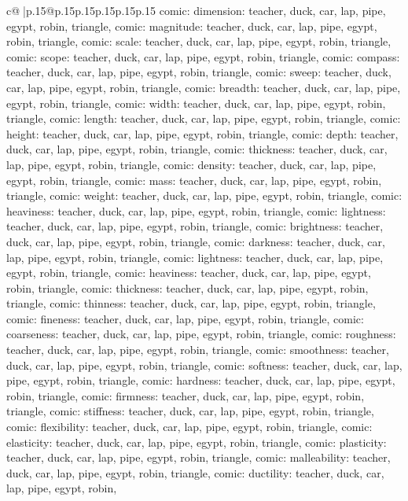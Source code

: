 \documentclass{article}
\begin{document}
{\begin{supertabular}{c@{$\;$}|p{.15\linewidth}@{}p{.15\linewidth}p{.15\linewidth}p{.15\linewidth}p{.15\linewidth}p{.15\linewidth}}
{{{comic\n\nCLUE: dimension\nTARGETS: teacher, duck, car, lap, pipe, egypt, robin, triangle, comic\n\nCLUE: magnitude\nTARGETS: teacher, duck, car, lap, pipe, egypt, robin, triangle, comic\n\nCLUE: scale\nTARGETS: teacher, duck, car, lap, pipe, egypt, robin, triangle, comic\n\nCLUE: scope\nTARGETS: teacher, duck, car, lap, pipe, egypt, robin, triangle, comic\n\nCLUE: compass\nTARGETS: teacher, duck, car, lap, pipe, egypt, robin, triangle, comic\n\nCLUE: sweep\nTARGETS: teacher, duck, car, lap, pipe, egypt, robin, triangle, comic\n\nCLUE: breadth\nTARGETS: teacher, duck, car, lap, pipe, egypt, robin, triangle, comic\n\nCLUE: width\nTARGETS: teacher, duck, car, lap, pipe, egypt, robin, triangle, comic\n\nCLUE: length\nTARGETS: teacher, duck, car, lap, pipe, egypt, robin, triangle, comic\n\nCLUE: height\nTARGETS: teacher, duck, car, lap, pipe, egypt, robin, triangle, comic\n\nCLUE: depth\nTARGETS: teacher, duck, car, lap, pipe, egypt, robin, triangle, comic\n\nCLUE: thickness\nTARGETS: teacher, duck, car, lap, pipe, egypt, robin, triangle, comic\n\nCLUE: density\nTARGETS: teacher, duck, car, lap, pipe, egypt, robin, triangle, comic\n\nCLUE: mass\nTARGETS: teacher, duck, car, lap, pipe, egypt, robin, triangle, comic\n\nCLUE: weight\nTARGETS: teacher, duck, car, lap, pipe, egypt, robin, triangle, comic\n\nCLUE: heaviness\nTARGETS: teacher, duck, car, lap, pipe, egypt, robin, triangle, comic\n\nCLUE: lightness\nTARGETS: teacher, duck, car, lap, pipe, egypt, robin, triangle, comic\n\nCLUE: brightness\nTARGETS: teacher, duck, car, lap, pipe, egypt, robin, triangle, comic\n\nCLUE: darkness\nTARGETS: teacher, duck, car, lap, pipe, egypt, robin, triangle, comic\n\nCLUE: lightness\nTARGETS: teacher, duck, car, lap, pipe, egypt, robin, triangle, comic\n\nCLUE: heaviness\nTARGETS: teacher, duck, car, lap, pipe, egypt, robin, triangle, comic\n\nCLUE: thickness\nTARGETS: teacher, duck, car, lap, pipe, egypt, robin, triangle, comic\n\nCLUE: thinness\nTARGETS: teacher, duck, car, lap, pipe, egypt, robin, triangle, comic\n\nCLUE: fineness\nTARGETS: teacher, duck, car, lap, pipe, egypt, robin, triangle, comic\n\nCLUE: coarseness\nTARGETS: teacher, duck, car, lap, pipe, egypt, robin, triangle, comic\n\nCLUE: roughness\nTARGETS: teacher, duck, car, lap, pipe, egypt, robin, triangle, comic\n\nCLUE: smoothness\nTARGETS: teacher, duck, car, lap, pipe, egypt, robin, triangle, comic\n\nCLUE: softness\nTARGETS: teacher, duck, car, lap, pipe, egypt, robin, triangle, comic\n\nCLUE: hardness\nTARGETS: teacher, duck, car, lap, pipe, egypt, robin, triangle, comic\n\nCLUE: firmness\nTARGETS: teacher, duck, car, lap, pipe, egypt, robin, triangle, comic\n\nCLUE: stiffness\nTARGETS: teacher, duck, car, lap, pipe, egypt, robin, triangle, comic\n\nCLUE: flexibility\nTARGETS: teacher, duck, car, lap, pipe, egypt, robin, triangle, comic\n\nCLUE: elasticity\nTARGETS: teacher, duck, car, lap, pipe, egypt, robin, triangle, comic\n\nCLUE: plasticity\nTARGETS: teacher, duck, car, lap, pipe, egypt, robin, triangle, comic\n\nCLUE: malleability\nTARGETS: teacher, duck, car, lap, pipe, egypt, robin, triangle, comic\n\nCLUE: ductility\nTARGETS: teacher, duck, car, lap, pipe, egypt, robin, }}}
\end{supertabular}}
\end{document}
